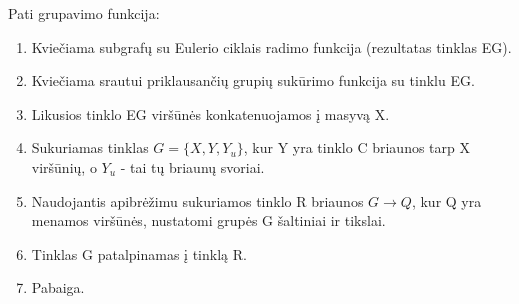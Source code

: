 Pati grupavimo funkcija:
\begin{enumerate}
	\item Kviečiama subgrafų su Eulerio ciklais radimo funkcija (rezultatas tinklas EG).
	\item Kviečiama srautui priklausančių grupių sukūrimo funkcija su tinklu EG.
	\item Likusios tinklo EG viršūnės konkatenuojamos į masyvą X.
	\item Sukuriamas tinklas $G=\{X, Y, Y_u\}$, kur Y yra tinklo C briaunos tarp X viršūnių, o $Y_u$ - tai tų briaunų svoriai. 
	\item Naudojantis apibrėžimu sukuriamos tinklo R briaunos $G \rightarrow Q$, kur Q yra menamos viršūnės, nustatomi grupės G šaltiniai ir tikslai.
	\item Tinklas G patalpinamas į tinklą R.
	\item Pabaiga.
\end{enumerate}

